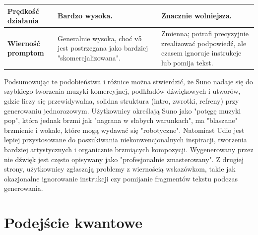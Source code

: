 \begin{table}
\begin{tabular}{p{59pt}p{129pt}p{129pt}}
\textbf{Prędkość działania}         & Bardzo wysoka.                                                                                                         & Znacznie wolniejsza.                                                                                                 \\ \hline
\textbf{Wierność promptom}            & Generalnie wysoka, choć v5 jest postrzegana jako bardziej "skomercjalizowana".                                         & Zmienna; potrafi precyzyjnie zrealizować podpowiedź, ale czasem ignoruje instrukcje lub pomija tekst.  
\\ \hline

\end{tabular}

\end{table}

Podsumowując te podobieństwa i różnice można stwierdzić, że Suno nadaje się do szybkiego tworzenia muzyki komercyjnej, podkładów dźwiękowych i utworów, gdzie liczy się przewidywalna, solidna struktura (intro, zwrotki, refreny) przy generowaniu jednorazowym. Użytkownicy określają Suno jako "potęgę muzyki pop", która jednak brzmi jak "nagrana w słabych warunkach", ma "blaszane" brzmienie i wokale, które mogą wydawać się "robotyczne". Natomiast Udio jest lepiej przystosowane do poszukiwania niekonwencjonalnych inspiracji, tworzenia bardziej artystycznych i organicznie brzmiących kompozycji. Wygenerowany przez nie dźwięk jest często opisywany jako "profesjonalnie zmasterowany". Z drugiej strony, użytkownicy zgłaszają problemy z wiernością wskazówkom, takie jak okazjonalne ignorowanie instrukcji czy pomijanie fragmentów tekstu podczas generowania.

\section{Podejście kwantowe}

